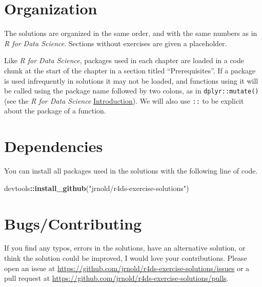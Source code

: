 \documentclass[]{book}
\newenvironment{Shaded}{\begin{snugshade}}{\end{snugshade}}
\newcommand{\KeywordTok}[1]{\textcolor[rgb]{0.13,0.29,0.53}{\textbf{#1}}}
\newcommand{\NormalTok}[1]{#1}
\newcommand{\OperatorTok}[1]{\textcolor[rgb]{0.81,0.36,0.00}{\textbf{#1}}}
\newcommand{\StringTok}[1]{\textcolor[rgb]{0.31,0.60,0.02}{#1}}
\theoremstyle{plain}
\theoremstyle{remark}
\begin{document}
\hypertarget{organization}{%
\section*{Organization}\label{organization}}

The solutions are organized in the same order, and with the
same numbers as in \emph{R for Data Science}. Sections without
exercises are given a placeholder.

Like \emph{R for Data Science}, packages used in each chapter are loaded in a code chunk at the start of the chapter in a section titled ``Prerequisites''.
If a package is used infrequently in solutions it may not
be loaded, and functions using it will be called using the
package name followed by two colons, as in \texttt{dplyr::mutate()} (see the \emph{R for Data Science} \href{http://r4ds.had.co.nz/introduction.html\#running-r-code}{Introduction}).
We will also use \texttt{::} to be explicit about the package of a
function.

\hypertarget{dependencies}{%
\section*{Dependencies}\label{dependencies}}

You can install all packages used in the solutions with the
following line of code.

\begin{Shaded}
\begin{Highlighting}[]
\NormalTok{devtools}\OperatorTok{::}\KeywordTok{install_github}\NormalTok{(}\StringTok{"jrnold/r4ds-exercise-solutions"}\NormalTok{)}
\end{Highlighting}
\end{Shaded}

\hypertarget{bugscontributing}{%
\section*{Bugs/Contributing}\label{bugscontributing}}

If you find any typos, errors in the solutions, have an alternative solution,
or think the solution could be improved, I would love your contributions.
Please open an issue at \url{https://github.com/jrnold/r4ds-exercise-solutions/issues} or a pull request at
\url{https://github.com/jrnold/r4ds-exercise-solutions/pulls}.
\end{document}
